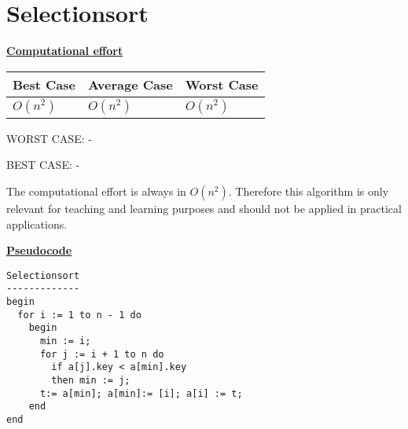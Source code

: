 \documentclass[a4paper]{report}
\begin{document}
\chapter*{Selectionsort}

\underline{\bf{Computational effort}}

\begin{tabular}{|l|l|l|}
\hline
Best Case    & Average Case  &  Worst Case\\ \hline
$O(n^2)$ & $O(n^2)$  &  $O(n^2)$  \\ \hline
\end{tabular}

WORST CASE: - 


BEST CASE: -

The computational effort is always in $O(n^2)$. Therefore this algorithm is only relevant for teaching and learning purposes and should not be applied in practical applications.

\underline{\bf{Pseudocode}}



\begin{lstlisting}
Selectionsort
-------------
begin
  for i := 1 to n - 1 do
    begin
      min := i;
      for j := i + 1 to n do 
        if a[j].key < a[min].key
        then min := j;
      t:= a[min]; a[min]:= [i]; a[i] := t;
    end
end
\end{lstlisting}
\end{document}
